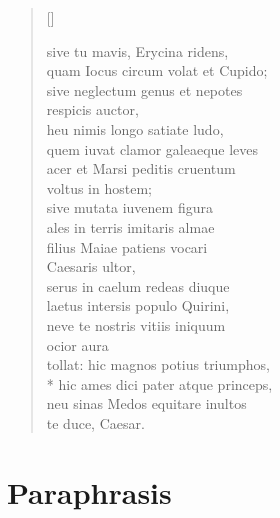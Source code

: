 \begin{verse}[\versewidth]
\begin{patverse*}
{sive tu mavis, Erycina ridens, 	\\
quam Iocus circum volat et Cupido; 	\\
sive neglectum genus et nepotes 	\\
  respicis auctor, 	\\
heu nimis longo satiate ludo, 	\\
quem iuvat clamor galeaeque leves 	\\
acer et Marsi peditis cruentum 	\\
  voltus in hostem; 	\\
sive mutata iuvenem figura 	\\
ales in terris imitaris almae 	\\
filius Maiae patiens vocari 	\\
  Caesaris ultor, 	\\
serus in caelum redeas diuque 	\\
laetus intersis populo Quirini, 	\\
neve te nostris vitiis iniquum 	\\
  ocior aura 	\\
tollat: hic magnos potius triumphos, 	\\*
hic ames dici pater atque princeps, 	\\
neu sinas Medos equitare inultos 	\\
  te duce, Caesar.\\
  
}
\end{patverse*}
\end{verse}


\section*{Paraphrasis}

